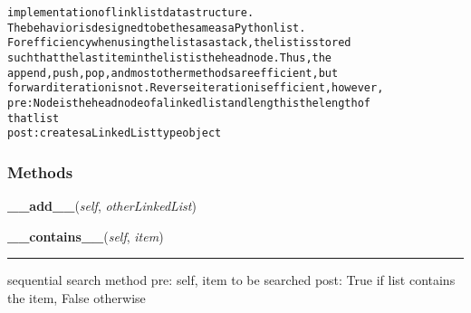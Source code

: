\begin{alltt}
implementation of link list data structure.
The behavior is designed to be the same as a Python list.
For efficiency when using the list as a stack, the list is stored
such that the last item in the list is the head node. Thus, the
append, push, pop, and most other methods are efficient, but
forward iteration is not. Reverse iteration is efficient, however,
pre:  Node is the head node of a linked list and length is the length of
      that list
post: creates a LinkedList type object
\end{alltt}



  \subsubsection{Methods}

    \label{coinor:blimpy:LinkedList':LinkedList:__add__}

    \vspace{0.5ex}

\hspace{.8\funcindent}\begin{boxedminipage}{\funcwidth}

    \raggedright \textbf{\_\_add\_\_}(\textit{self}, \textit{otherLinkedList})

\setlength{\parskip}{2ex}
\setlength{\parskip}{1ex}
    \end{boxedminipage}

    \label{coinor:blimpy:LinkedList':LinkedList:__contains__}

    \vspace{0.5ex}

\hspace{.8\funcindent}\begin{boxedminipage}{\funcwidth}

    \raggedright \textbf{\_\_contains\_\_}(\textit{self}, \textit{item})

    \vspace{-1.5ex}

    \rule{\textwidth}{0.5\fboxrule}
\setlength{\parskip}{2ex}
    sequential search method pre: self, item to be searched post: True if 
    list contains the item, False otherwise

\setlength{\parskip}{1ex}
    \end{boxedminipage}

